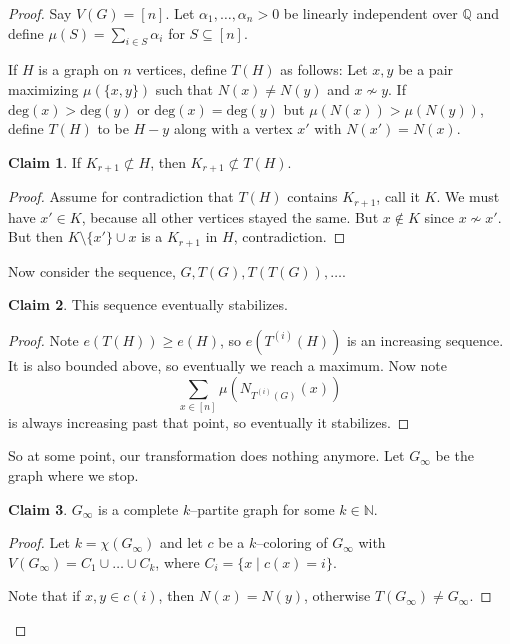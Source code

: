\documentclass{article}
\theoremstyle{definition}
\newtheorem*{claim*}{Claim}
\begin{document}
\begin{proof}
    Say $V(G)=[n]$. Let $\alpha_1,\ldots,\alpha_n >0$ be linearly independent over $\mathbb{Q}$ and define $\mu(S) = \sum_{i \in S}^{} \alpha_i$ for $S \subseteq [n]$.
    
    \vspace{1mm}
    
    If $H$ is a graph on $n$ vertices, define $T(H)$ as follows: Let $x,y$ be a pair maximizing $\mu(\{x,y\})$ such that $N(x) \neq N(y)$ and $x \not\sim y$. If $\text{deg}(x) > \text{deg}(y)$ or $\text{deg}(x) = \text{deg}(y)$ but $\mu(N(x)) > \mu(N(y))$, define $T(H)$ to be $H-y$ along with a vertex $x'$ with $N(x') = N(x)$.
    \vspace{1mm}
    
    \begin{claim*}
        If $K_{r+1} \not\subset H$, then $K_{r+1} \not\subset T(H)$.
    \end{claim*}
    \begin{proof}
        Assume for contradiction that $T(H)$ contains $K_{r+1}$, call it $K$. We must have $x' \in K$, because all other vertices stayed the same. But $x \not\in K$ since $x \not\sim x'$. But then $K \setminus \{x'\} \cup x$ is a $K_{r+1}$ in $H$, contradiction.
    \end{proof}
    Now consider the sequence, $G,T(G),T(T(G)),\ldots$.
    \begin{claim*}
        This sequence eventually stabilizes.
    \end{claim*}
    \begin{proof}
        Note $e(T(H)) \ge e(H)$, so $e(T^{(i)}(H))$ is an increasing sequence. It is also bounded above, so eventually we reach a maximum. Now note
        \[
        \sum_{x \in [n]}^{} \mu(N_{T^(i)(G)}(x))
        \]
        is always increasing past that point, so eventually it stabilizes.
    \end{proof}
    So at some point, our transformation does nothing anymore. Let $G_{\infty}$ be the graph where we stop.
    \begin{claim*}
        $G_{\infty}$ is a complete $k$--partite graph for some $k \in \mathbb{N}$.
    \end{claim*}
    \begin{proof}
        Let $k = \chi(G_{\infty})$ and let $c$ be a $k$--coloring of $G_{\infty}$ with $V(G_{\infty}) = C_1 \cup \ldots \cup C_k$, where $C_i = \{x \mid  c(x)=i\}$.

        Note that if $x,y \in c(i)$, then $N(x)=N(y)$, otherwise $T(G_{\infty}) \neq G_{\infty}$. 
        

\end{proof}
\end{proof}
\end{document}
